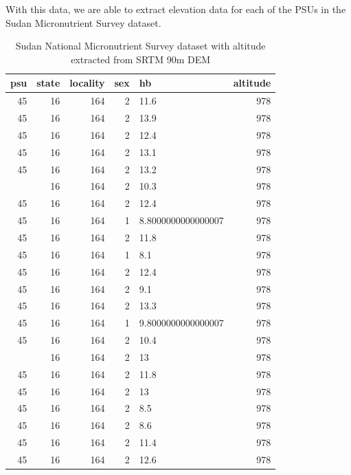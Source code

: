 \documentclass[12pt,a4paper]{article}
\begin{document}
With this data, we are able to extract elevation data for each of the PSUs in the Sudan Micronutrient Survey dataset.

\newpage

\begin{table}[H]

\caption{\label{tab:elevation2}Sudan National Micronutrient Survey dataset with altitude extracted from SRTM 90m DEM}
\centering
\begin{tabular}[t]{rrrrlr}
\toprule
\textbf{psu} & \textbf{state} & \textbf{locality} & \textbf{sex} & \textbf{hb} & \textbf{altitude}\\
\midrule
\rowcolor{gray!6}  45 & 16 & 164 & 2 & 11.6 & \vphantom{1} 978\\
45 & 16 & 164 & 2 & 13.9 & 978\\
\rowcolor{gray!6}  45 & 16 & 164 & 2 & 12.4 & \vphantom{2} 978\\
45 & 16 & 164 & 2 & 13.1 & 978\\
\rowcolor{gray!6}  45 & 16 & 164 & 2 & 13.2 & 978\\
\addlinespace
45 & 16 & 164 & 2 & 10.3 & 978\\
\rowcolor{gray!6}  45 & 16 & 164 & 2 & 12.4 & \vphantom{1} 978\\
45 & 16 & 164 & 1 & 8.8000000000000007 & 978\\
\rowcolor{gray!6}  45 & 16 & 164 & 2 & 11.8 & \vphantom{1} 978\\
45 & 16 & 164 & 1 & 8.1 & 978\\
\addlinespace
\rowcolor{gray!6}  45 & 16 & 164 & 2 & 12.4 & \vphantom{2} 978\\
45 & 16 & 164 & 2 & 9.1 & 978\\
\rowcolor{gray!6}  45 & 16 & 164 & 2 & 13.3 & 978\\
45 & 16 & 164 & 1 & 9.8000000000000007 & 978\\
\rowcolor{gray!6}  45 & 16 & 164 & 2 & 10.4 & 978\\
\addlinespace
45 & 16 & 164 & 2 & 13 & \vphantom{1} 978\\
\rowcolor{gray!6}  45 & 16 & 164 & 2 & 11.8 & \vphantom{1} 978\\
45 & 16 & 164 & 2 & 13 & \vphantom{1} 978\\
\rowcolor{gray!6}  45 & 16 & 164 & 2 & 8.5 & 978\\
45 & 16 & 164 & 2 & 8.6 & 978\\
\addlinespace
\rowcolor{gray!6}  45 & 16 & 164 & 2 & 11.4 & 978\\
45 & 16 & 164 & 2 & 12.6 & 978\\

\end{tabular}
\end{table}
\end{document}
